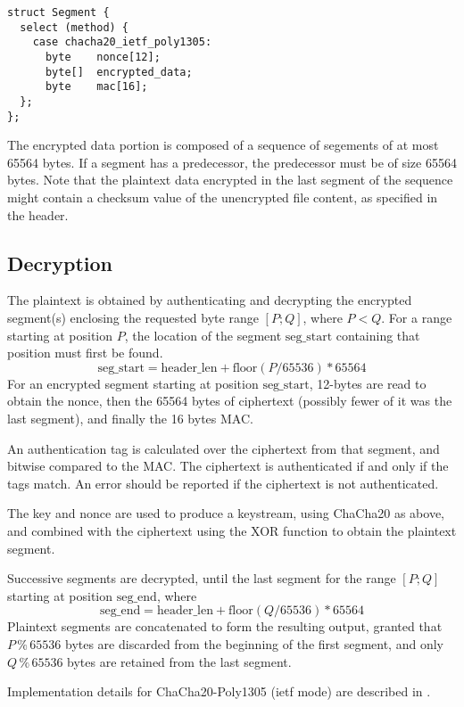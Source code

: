 \begin{verbatim}
struct Segment {
  select (method) {
    case chacha20_ietf_poly1305:
      byte    nonce[12];
      byte[]  encrypted_data;
      byte    mac[16];
  };
};
\end{verbatim}

The encrypted data portion is composed of a sequence of segements of at most 65564 bytes. If a segment has a predecessor, the predecessor must be of size 65564 bytes. Note that the plaintext data encrypted in the last segment of the sequence might contain a checksum value of the unencrypted file content, as specified in the header.

\subsection{Decryption}
The plaintext is obtained by authenticating and decrypting the encrypted segment(s) enclosing the requested byte range $[P;Q]$, where $P<Q$.
%
For a range starting at position $P$, the location of the segment $\text{seg\_start}$ containing that position must first be found.
%
$$\text{seg\_start} = \text{header\_len} + \text{floor}(P/65536) * 65564$$
%
For an encrypted segment starting at position $\text{seg\_start}$, 12-bytes are read to obtain the nonce, then the 65564 bytes of ciphertext (possibly fewer of it was the last segment), and finally the 16 bytes MAC.

An authentication tag is calculated over the ciphertext from that segment, and bitwise compared to the MAC. The ciphertext is authenticated if and only if the tags match.
%
An error should be reported if the ciphertext is not authenticated.

The key and nonce are used to produce a keystream, using ChaCha20 as above, and combined with the ciphertext using the XOR function to obtain the plaintext segment.

Successive segments are decrypted, until the last segment for the range $[P;Q]$ starting at position $\text{seg\_end}$, where %
%
$$\text{seg\_end} = \text{header\_len} + \text{floor}(Q/65536) * 65564$$
%
Plaintext segments are concatenated to form the resulting output, granted that $P \mathbin{\%} 65536$ bytes are discarded from the beginning of the first segment, and only $Q \mathbin{\%} 65536$ bytes are retained from the last segment.

Implementation details for ChaCha20-Poly1305 (ietf mode) are described in \cite{RFC8439}.

